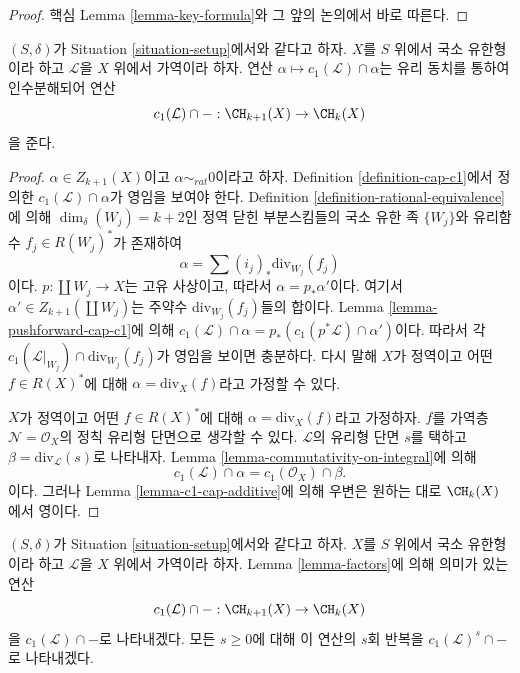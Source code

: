 \begin{proof}
핵심 Lemma \ref{lemma-key-formula}와 그 앞의 논의에서 바로 따른다.
\end{proof}

\begin{lemma}
\label{lemma-factors}
$(S, \delta)$가 Situation \ref{situation-setup}에서와 같다고 하자.
$X$를 $S$ 위에서 국소 유한형이라 하고 $\mathcal{L}$을 $X$ 위에서
가역이라 하자. 연산 $\alpha \mapsto c_1(\mathcal{L}) \cap \alpha$는
유리 동치를 통하여 인수분해되어 연산
$$
c_1(\mathcal{L}) \cap - : \CH_{k + 1}(X) \to \CH_k(X)
$$
을 준다.
\end{lemma}

\begin{proof}
$\alpha \in Z_{k + 1}(X)$이고 $\alpha \sim_{rat} 0$이라고 하자.
Definition \ref{definition-cap-c1}에서 정의한
$c_1(\mathcal{L}) \cap \alpha$가 영임을 보여야 한다. Definition
\ref{definition-rational-equivalence}에 의해
$\dim_\delta(W_j) = k + 2$인 정역 닫힌 부분스킴들의 국소 유한 족
$\{W_j\}$와 유리함수 $f_j \in R(W_j)^*$가 존재하여
$$
\alpha = \sum (i_j)_*\text{div}_{W_j}(f_j)
$$
이다. $p : \coprod W_j \to X$는 고유 사상이고, 따라서
$\alpha = p_*\alpha'$이다. 여기서
$\alpha' \in Z_{k + 1}(\coprod W_j)$는 주약수
$\text{div}_{W_j}(f_j)$들의 합이다. Lemma
\ref{lemma-pushforward-cap-c1}에 의해
$c_1(\mathcal{L}) \cap \alpha = p_*(c_1(p^*\mathcal{L}) \cap \alpha')$이다.
따라서 각 $c_1(\mathcal{L}|_{W_j}) \cap \text{div}_{W_j}(f_j)$가 영임을
보이면 충분하다. 다시 말해 $X$가 정역이고 어떤 $f \in R(X)^*$에 대해
$\alpha = \text{div}_X(f)$라고 가정할 수 있다.

\medskip\noindent
$X$가 정역이고 어떤 $f \in R(X)^*$에 대해
$\alpha = \text{div}_X(f)$라고 가정하자. $f$를 가역층
$\mathcal{N} = \mathcal{O}_X$의 정칙 유리형 단면으로 생각할 수 있다.
$\mathcal{L}$의 유리형 단면 $s$를 택하고
$\beta = \text{div}_\mathcal{L}(s)$로 나타내자. Lemma
\ref{lemma-commutativity-on-integral}에 의해
$$
c_1(\mathcal{L}) \cap \alpha = c_1(\mathcal{O}_X) \cap \beta.
$$
이다. 그러나 Lemma \ref{lemma-c1-cap-additive}에 의해 우변은 원하는
대로 $\CH_k(X)$에서 영이다.
\end{proof}

\noindent
$(S, \delta)$가 Situation \ref{situation-setup}에서와 같다고 하자.
$X$를 $S$ 위에서 국소 유한형이라 하고 $\mathcal{L}$을 $X$ 위에서
가역이라 하자. Lemma \ref{lemma-factors}에 의해 의미가 있는 연산
$$
c_1(\mathcal{L}) \cap - : \CH_{k + 1}(X) \to \CH_k(X)
$$
을 $c_1(\mathcal{L}) \cap - $로 나타내겠다. 모든 $s \geq 0$에 대해
이 연산의 $s$회 반복을 $c_1(\mathcal{L})^s \cap -$로 나타내겠다.

